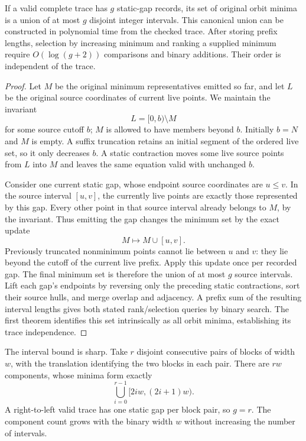 \begin{theorem}
If a valid complete trace has $g$ static-gap records, its set of original
orbit minima is a union of at most $g$ disjoint integer intervals.  This
canonical union can be constructed in polynomial time from the checked
trace.  After storing prefix lengths, selection by increasing minimum
and ranking a supplied minimum require $O(\log(g+2))$ comparisons and
binary additions.  Their order is independent of the trace.
\end{theorem}
\begin{proof}
Let $M$ be the original minimum representatives emitted so far, and let
$L$ be the original source coordinates of current live points.  We maintain
the invariant
\[
 L=[0,b)\setminus M
\]
for some source cutoff $b$; $M$ is allowed to have members beyond $b$.
Initially $b=N$ and $M$ is empty.  A suffix truncation retains an initial
segment of the ordered live set, so it only decreases $b$.  A static
contraction moves some live source points from $L$ into $M$ and leaves
the same equation valid with unchanged $b$.

Consider one current static gap, whose endpoint source coordinates are
$u\le v$.  In the source interval $[u,v]$, the currently live points are
exactly those represented by this gap.  Every other point in that source
interval already belongs to $M$, by the invariant.  Thus emitting the gap
changes the minimum set by the exact update
\[
 M\longmapsto M\cup[u,v].
\]
Previously truncated nonminimum points cannot lie between $u$ and $v$:
they lie beyond the cutoff of the current live prefix.  Apply this update
once per recorded gap.  The final minimum set is therefore the union of
at most $g$ source intervals.  Lift each gap's endpoints by reversing only
the preceding static contractions, sort their source hulls, and merge
overlap and adjacency.  A prefix sum of the resulting interval lengths
gives both stated rank/selection queries by binary search.  The first
theorem identifies this set intrinsically as all orbit minima, establishing
its trace independence.
\end{proof}

The interval bound is sharp.  Take $r$ disjoint consecutive pairs of
blocks of width $w$, with the translation identifying the two blocks in
each pair.  There are $rw$ components, whose minima form exactly
\[
 \bigcup_{i=0}^{r-1}[2iw,(2i+1)w).
\]
A right-to-left valid trace has one static gap per block pair, so $g=r$.
The component count grows with the binary width $w$ without increasing
the number of intervals.

